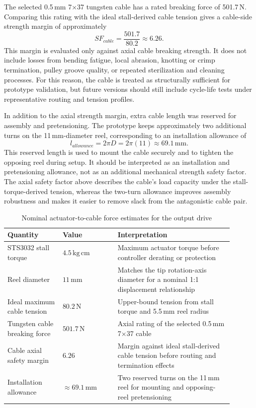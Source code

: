 The selected 0.5\,mm 7$\times$37 tungsten cable has a rated breaking force of 501.7\,N. Comparing this rating with the ideal stall-derived cable tension gives a cable-side strength margin of approximately
\[
SF_{cable}=\frac{501.7}{80.2}\approx 6.26 .
\]
This margin is evaluated only against axial cable breaking strength. It does not include losses from bending fatigue, local abrasion, knotting or crimp termination, pulley groove quality, or repeated sterilization and cleaning processes. For this reason, the cable is treated as structurally sufficient for prototype validation, but future versions should still include cycle-life tests under representative routing and tension profiles.

In addition to the axial strength margin, extra cable length was reserved for assembly and pretensioning. The prototype keeps approximately two additional turns on the 11\,mm-diameter reel, corresponding to an installation allowance of
\[
l_{allowance}=2\pi D=2\pi(11)\approx 69.1\,\mathrm{mm}.
\]
This reserved length is used to mount the cable securely and to tighten the opposing reel during setup. It should be interpreted as an installation and pretensioning allowance, not as an additional mechanical strength safety factor. The axial safety factor above describes the cable's load capacity under the stall-torque-derived tension, whereas the two-turn allowance improves assembly robustness and makes it easier to remove slack from the antagonistic cable pair.

\begin{table}[htbp]
    \centering
    \caption{Nominal actuator-to-cable force estimates for the output drive}
    \label{tab:actuator_cable_force}
    \small
    \setlength{\tabcolsep}{4pt}
    \begin{tabular}{@{}p{0.22\linewidth} p{0.22\linewidth} p{0.46\linewidth}@{}}
        \toprule
        Quantity & Value & Interpretation \\
        \midrule
        STS3032 stall torque & $4.5\,\mathrm{kg\,cm}$ & Maximum actuator torque before controller derating or protection \\
        Reel diameter & $11\,\mathrm{mm}$ & Matches the tip rotation-axis diameter for a nominal 1:1 displacement relationship \\
        Ideal maximum cable tension & $80.2\,\mathrm{N}$ & Upper-bound tension from stall torque and 5.5\,mm reel radius \\
        Tungsten cable breaking force & $501.7\,\mathrm{N}$ & Axial rating of the selected 0.5\,mm 7$\times$37 cable \\
        Cable axial safety margin & $6.26$ & Margin against ideal stall-derived cable tension before routing and termination effects \\
        Installation allowance & $\approx69.1\,\mathrm{mm}$ & Two reserved turns on the 11\,mm reel for mounting and opposing-reel pretensioning \\
        \bottomrule
    \end{tabular}
\end{table}

